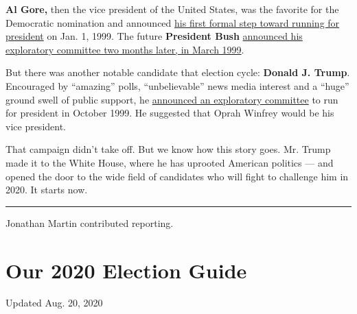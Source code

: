 \textbf{Al Gore,} then the vice president of the United States, was the
favorite for the Democratic nomination and announced
\href{https://www.nytimes3xbfgragh.onion/1999/01/01/us/gore-forming-organization-for-2000-bid-for-president.html}{his
first formal step toward running for president} on Jan. 1, 1999. The
future \textbf{President Bush}
\href{https://www.nytimes3xbfgragh.onion/1999/03/03/opinion/the-fight-in-george-bush-s-future.html}{announced
his exploratory committee two months later, in March 1999}.

But there was another notable candidate that election cycle:
\textbf{Donald J. Trump}. Encouraged by ``amazing'' polls,
``unbelievable'' news media interest and a ``huge'' ground swell of
public support, he
\href{https://www.nytimes3xbfgragh.onion/1999/10/08/us/citing-public-support-trump-forms-exploratory-committee-on-presidency.html}{announced
an exploratory committee} to run for president in October 1999. He
suggested that Oprah Winfrey would be his vice president.

That campaign didn't take off. But we know how this story goes. Mr.
Trump made it to the White House, where he has uprooted American
politics --- and opened the door to the wide field of candidates who
will fight to challenge him in 2020. It starts now.

\begin{center}\rule{0.5\linewidth}{\linethickness}\end{center}

Jonathan Martin contributed reporting.

\hypertarget{our-2020-election-guide}{%
\section{Our 2020 Election Guide}\label{our-2020-election-guide}}

Updated Aug. 20, 2020

